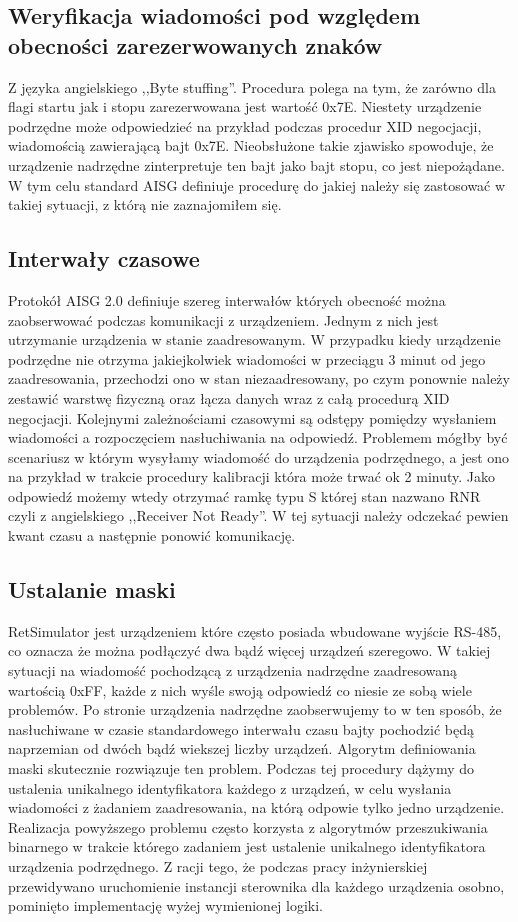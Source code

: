 \subsection{Weryfikacja wiadomości pod względem obecności zarezerwowanych znaków}
    Z języka angielskiego ,,Byte stuffing''. Procedura polega na tym, że zarówno dla flagi startu jak i stopu zarezerwowana jest wartość 0x7E.
    Niestety urządzenie podrzędne może odpowiedzieć na przykład podczas procedur XID negocjacji, wiadomością zawierającą bajt 0x7E. Nieobsłużone
    takie zjawisko spowoduje, że urządzenie nadrzędne zinterpretuje ten bajt jako bajt stopu, co jest niepożądane. W tym celu standard AISG 
    definiuje procedurę do jakiej należy się zastosować w takiej sytuacji, z którą nie zaznajomiłem się.
\subsection{Interwały czasowe}
    Protokół AISG 2.0 definiuje szereg interwałów których obecność można zaobserwować podczas komunikacji z urządzeniem. Jednym z nich jest
    utrzymanie urządzenia w stanie zaadresowanym. W przypadku kiedy urządzenie podrzędne nie otrzyma jakiejkolwiek wiadomości w przeciągu 3 minut
    od jego zaadresowania, przechodzi ono w stan niezaadresowany, po czym ponownie należy zestawić warstwę fizyczną oraz łącza danych wraz
    z całą procedurą XID negocjacji. Kolejnymi zależnościami czasowymi są odstępy pomiędzy wysłaniem wiadomości a rozpoczęciem nasłuchiwania na odpowiedź.
    Problemem mógłby być scenariusz w którym wysyłamy wiadomość do urządzenia podrzędnego, a jest ono na przykład w trakcie procedury kalibracji która może 
    trwać ok 2 minuty. Jako odpowiedź możemy wtedy otrzymać ramkę typu S której stan nazwano RNR czyli z angielskiego ,,Receiver Not Ready''. 
    W tej sytuacji należy odczekać pewien kwant czasu a następnie ponowić komunikację.
\subsection{Ustalanie maski}
    RetSimulator jest urządzeniem które często posiada wbudowane wyjście RS-485, co oznacza że można podłączyć dwa bądź więcej urządzeń szeregowo. 
    W takiej sytuacji na wiadomość pochodzącą z urządzenia nadrzędne zaadresowaną wartością 0xFF, każde z nich wyśle swoją odpowiedź co niesie ze sobą wiele problemów.
    Po stronie urządzenia nadrzędne zaobserwujemy to w ten sposób, że nasłuchiwane w czasie standardowego interwału czasu bajty
    pochodzić będą naprzemian od dwóch bądź wiekszej liczby urządzeń. Algorytm definiowania maski skutecznie rozwiązuje ten problem. 
    Podczas tej procedury dążymy do ustalenia unikalnego identyfikatora każdego z urządzeń, w celu wysłania wiadomości z żadaniem zaadresowania,
    na którą odpowie tylko jedno urządzenie. Realizacja powyższego problemu często korzysta z algorytmów przeszukiwania binarnego w trakcie którego
    zadaniem jest ustalenie unikalnego identyfikatora urządzenia podrzędnego. Z racji tego, że podczas pracy inżynierskiej
    przewidywano uruchomienie instancji sterownika dla każdego urządzenia osobno, pominięto implementację wyżej wymienionej logiki.
